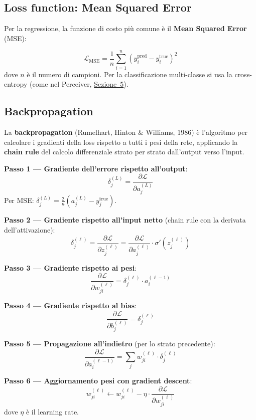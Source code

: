 \documentclass[12pt,a4paper]{article}
\begin{document}
\subsection{Loss function: Mean Squared Error}

Per la regressione, la funzione di costo pi\`u comune \`e il \textbf{Mean Squared Error} (MSE):

\begin{formulabox}
\[
    \mathcal{L}_{\text{MSE}} = \frac{1}{n} \sum_{i=1}^{n} \left(y_i^{\text{pred}} - y_i^{\text{true}}\right)^2
\]
dove $n$ \`e il numero di campioni. Per la classificazione multi-classe si usa la cross-entropy (come nel Perceiver, \hyperref[sec:forward]{Sezione~5}).
\end{formulabox}


\subsection{Backpropagation}

La \textbf{backpropagation} (Rumelhart, Hinton \& Williams, 1986) \`e l'algoritmo per calcolare i gradienti della loss rispetto a tutti i pesi della rete, applicando la \textbf{chain rule} del calcolo differenziale strato per strato dall'output verso l'input.

\begin{formulabox}

\textbf{Passo 1 --- Gradiente dell'errore rispetto all'output}:
\[
    \delta_j^{(L)} = \frac{\partial \mathcal{L}}{\partial a_j^{(L)}}
\]
Per MSE: $\delta_j^{(L)} = \frac{2}{n}(a_j^{(L)} - y_j^{\text{true}})$.

\textbf{Passo 2 --- Gradiente rispetto all'input netto} (chain rule con la derivata dell'attivazione):
\[
    \delta_j^{(\ell)} = \frac{\partial \mathcal{L}}{\partial z_j^{(\ell)}} = \frac{\partial \mathcal{L}}{\partial a_j^{(\ell)}} \cdot \sigma'\!\left(z_j^{(\ell)}\right)
\]

\textbf{Passo 3 --- Gradiente rispetto ai pesi}:
\[
    \frac{\partial \mathcal{L}}{\partial w_{ji}^{(\ell)}} = \delta_j^{(\ell)} \cdot a_i^{(\ell-1)}
\]

\textbf{Passo 4 --- Gradiente rispetto al bias}:
\[
    \frac{\partial \mathcal{L}}{\partial b_j^{(\ell)}} = \delta_j^{(\ell)}
\]

\textbf{Passo 5 --- Propagazione all'indietro} (per lo strato precedente):
\[
    \frac{\partial \mathcal{L}}{\partial a_i^{(\ell-1)}} = \sum_j w_{ji}^{(\ell)} \cdot \delta_j^{(\ell)}
\]

\textbf{Passo 6 --- Aggiornamento pesi con gradient descent}:
\[
    w_{ji}^{(\ell)} \leftarrow w_{ji}^{(\ell)} - \eta \cdot \frac{\partial \mathcal{L}}{\partial w_{ji}^{(\ell)}}
\]
dove $\eta$ \`e il learning rate.
\end{formulabox}
\end{document}
